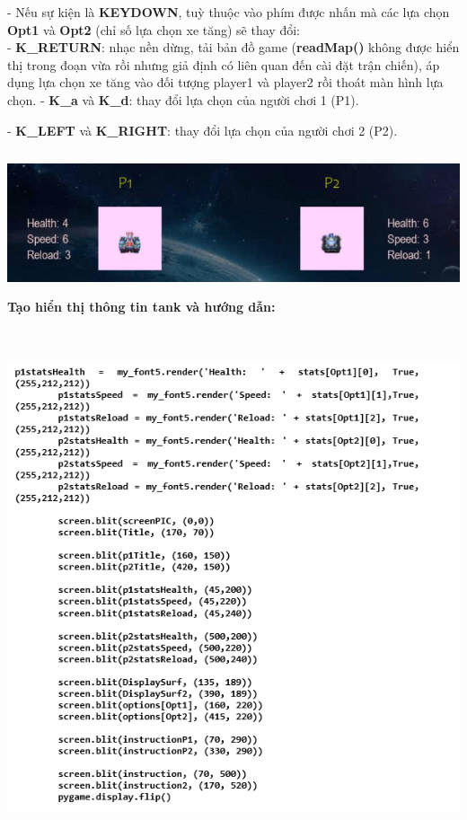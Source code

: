 \documentclass[a4paper]{article}
\begin{document}
- Nếu sự kiện là \textbf{KEYDOWN}, tuỳ thuộc vào phím được nhấn mà các
lựa chọn \textbf{Opt1} và \textbf{Opt2} (chỉ số lựa chọn xe tăng) sẽ
thay đổi:\\
- \textbf{K\_RETURN}: nhạc nền dừng, tải bản đồ game (\textbf{readMap()}
không được hiển thị trong đoạn vừa rồi nhưng giả định có liên quan đến
cài đặt trận chiến), áp dụng lựa chọn xe tăng vào đối tượng player1 và
player2 rồi thoát màn hình lựa chọn. - \textbf{K\_a} và \textbf{K\_d}:
thay đổi lựa chọn của người chơi 1 (P1).

- \textbf{K\_LEFT} và \textbf{K\_RIGHT}: thay đổi lựa chọn của người
chơi 2 (P2).

\includegraphics[width=6.3in,height=1.65in]{image34.png}
\newpage
\textbf{Tạo hiển thị thông tin tank và hướng dẫn:}

\includegraphics[width=6.5in, height=6in]{image34_1.png}
\end{document}
